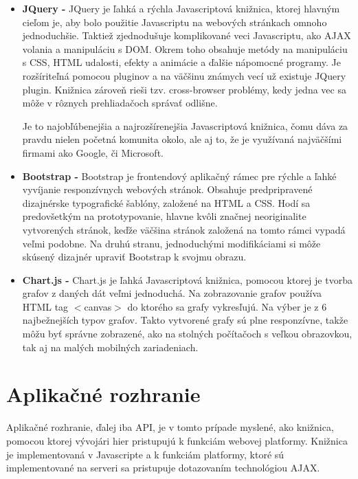 \begin{itemize}
\item \textbf{JQuery -} JQuery je ľahká a rýchla Javascriptová knižnica, ktorej hlavným cieľom je, aby bolo použitie Javascriptu na webových stránkach omnoho jednoduchšie. Taktiež zjednodušuje komplikované veci Javascriptu, ako AJAX volania a manipuláciu s DOM. Okrem toho obsahuje metódy na manipuláciu s CSS, HTML udalosti, efekty a animácie a ďalšie nápomocné programy. Je rozšíriteľná pomocou pluginov a na väčšinu známych vecí už existuje JQuery plugin. Knižnica zároveň rieši tzv. cross-browser problémy, kedy jedna vec sa môže v rôznych prehliadačoch správať odlišne.

Je to najobľúbenejšia a najrozšírenejšia Javascriptová knižnica, čomu dáva za pravdu nielen početná komunita okolo, ale aj to, že je využívaná najväčšími firmami ako Google, či Microsoft.

\item \textbf{Bootstrap -} Bootstrap je frontendový aplikačný rámec pre rýchle a ľahké vyvíjanie responzívnych webových stránok. Obsahuje predpripravené dizajnérske typografické šablóny, založené na HTML a CSS. Hodí sa predovšetkým na prototypovanie, hlavne kvôli značnej neoriginalite vytvorených stránok, keďže väčšina stránok založená na tomto rámci vypadá veľmi podobne. Na druhú stranu, jednoduchými modifikáciami si môže skúsený dizajnér upraviť Bootstrap k svojmu obrazu.

\item \textbf{Chart.js -} Chart.js je ľahká Javascriptová knižnica, pomocou ktorej je tvorba grafov z daných dát veľmi jednoduchá. Na zobrazovanie grafov používa HTML tag $<$canvas$>$ do ktorého sa grafy vykresľujú. Na výber je z 6 najbežnejších typov grafov. Takto vytvorené grafy sú plne responzívne, takže môžu byť správne zobrazené, ako na stolných počítačoch s veľkou obrazovkou, tak aj na malých mobilných zariadeniach.

\end{itemize}

\section{Aplikačné rozhranie}
\label{sec:api}
Aplikačné rozhranie, ďalej iba API, je v tomto prípade myslené, ako knižnica, pomocou ktorej vývojári hier pristupujú k funkciám webovej platformy. Knižnica je implementovaná v Javascripte a k funkciám platformy, ktoré sú implementované na serveri sa pristupuje dotazovaním technológiou AJAX.

